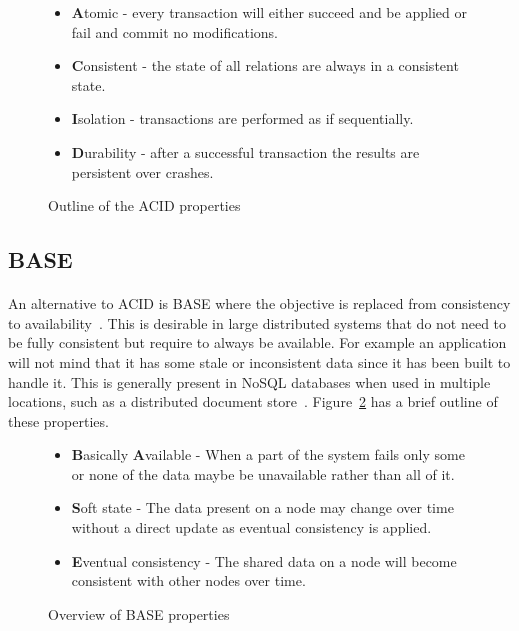 \documentclass{CRPITStyle}
\renewcommand{\cite}{\citep}
\begin{document}
\begin{figure}
\begin{itemize}
    \item \textbf{A}tomic - every transaction will either
        succeed and be applied or fail and commit no modifications.
    \item \textbf{C}onsistent - the state of all relations are
        always in a consistent state.
    \item \textbf{I}solation - transactions are performed as if sequentially.
    \item \textbf{D}urability - after a successful transaction the results
        are persistent over crashes.
\end{itemize}
    \caption{Outline of the ACID properties~\cite{relational_db,base}}\label{l:acid}
\end{figure}
%

\subsection{BASE}

\paragraph{}
An alternative to ACID is BASE where the objective is replaced from consistency
to availability~\cite{nosql_survey}.
This is desirable in large distributed systems that do not need to be
fully consistent but require to always be available.
For example an application will not mind that it has some stale or
inconsistent data since it has been built to handle it.
This is generally present in NoSQL databases when used in multiple
locations, such as a distributed document store~\cite{base}.
Figure~\ref{l:base} has a brief outline of these properties.

\begin{figure}
\begin{itemize}
    \item \textbf{B}asically \textbf{A}vailable - When a part of the system
        fails only some or none of the data maybe be unavailable rather than
        all of it.
    \item \textbf{S}oft state - The data present on a node may change over time
        without a direct update as eventual consistency is applied.
    \item \textbf{E}ventual consistency - The shared data on a node will become consistent with
        other nodes over time.
\end{itemize}
\caption{Overview of BASE properties~\cite{base}}\label{l:base}
\end{figure}
\end{document}
